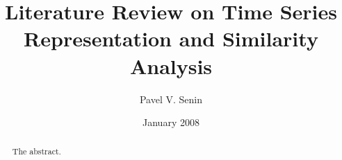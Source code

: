 \documentclass[12pt]{report}
\begin{document}
\title{Literature Review on Time Series Representation and Similarity Analysis}
\author{Pavel V. Senin}
\date{January 2008}

\maketitle

\tableofcontents

\begin{abstract}
The abstract.
\end{abstract}







%
%
\end{document}
